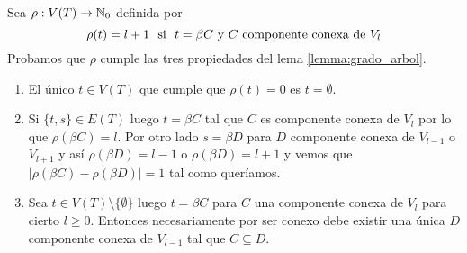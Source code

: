 \documentclass[tesis.tex]{subfiles}
\begin{document}
\begin{deff}
	Sea $\rho:V(T) \to \mathbb{N}_{0}$ definida por
	\[
	\rho(t) = 	l+1  \ \  \text{si} \ \  t = \beta C \ \text{y}  \ C \ \text{componente conexa de $V_{l}$} \\
	\]
	Probamos que $\rho$ cumple las tres propiedades del lema \ref{lemma:grado_arbol}.
	\begin{enumerate}
		\item El único $t \in V(T)$ que cumple que $\rho(t) = 0$ es $t = \emptyset$.
		\item 
			Si $\{t,s\} \in E(T)$ luego $t = \beta C$ tal que $C$ es componente conexa de $V_{l}$ por lo que $\rho(\beta C) = l$. 
			Por otro lado $s = \beta D$ para $D$ componente conexa de $V_{l-1}$ o $V_{l+1}$ y así $\rho(\beta D) = l-1$ o $\rho(\beta D) = l+1$ y vemos que $|\rho(\beta C) - \rho(\beta D)| = 1$ tal como queríamos.
			
		\item 
			Sea $t \in V(T) \setminus \{\emptyset \}$ luego $t = \beta C$ para $C$ una componente conexa de $V_{l}$ para cierto $l \ge 0$. Entonces necesariamente por ser conexo debe existir una única $D$ componente conexa de $V_{l-1}$ tal que $C \subseteq D$. 
	\end{enumerate}
	
		
		
		

\end{deff}
\end{document}
